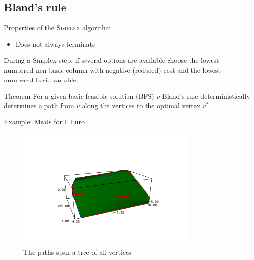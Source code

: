 \documentclass[10pt]{beamer}
\begin{document}
\subsection{Bland's rule}
\begin{frame}{Properties of the \textsc{Simplex} algorithm}
	
	\begin{itemize}
		\item Does not always terminate
	\end{itemize}
	\pause
	\begin{definition}
		During a Simplex step, if several options are available choose the lowest-numbered non-basic column with negative (reduced) cost and the lowest-numbered basic variable.
	\end{definition}
	\pause 
	\begin{alertblock}{Theorem}
		For a given basic feasible solution (BFS) $v$ Bland's rule deterministically determines a path from $v$ along the vertices to the optimal vertex $v^*$.
	\end{alertblock}
\end{frame}

\begin{frame}{}
	\begin{exampleblock}{Example: Meals for 1 Euro}
		\begin{figure}[ht]
			\includegraphics[width = 0.8\textwidth]{Polytope_tree.png}
			\caption{The paths span a tree of all vertices}
		\end{figure}
	\end{exampleblock}
\end{frame}
\end{document}
